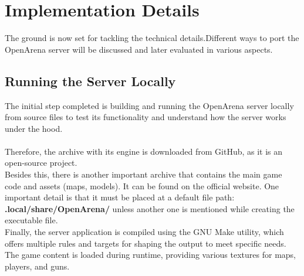 \chapter{Implementation Details}
\label{chapter:impldet}
The ground is now set for tackling the technical details.\@ Different ways to port the OpenArena server will be discussed and later evaluated in various aspects.
\section{Running the Server Locally}
The initial step completed is building and running the OpenArena server locally from source files to test its functionality and understand
how the server works under the hood. \\ \\
Therefore, the archive with its engine is downloaded from GitHub\cite{openarena-github}, as it is an open-source project. \\
Besides this, there is another important archive that contains the main game code and assets (maps, models). It can be found on the official website\cite{openarena-download}. One important
detail is that it must be placed at a default file path: \textbf{.local/share/OpenArena/} unless another one is mentioned while creating the executable file. \\
Finally, the server application is compiled using the GNU Make utility, which offers multiple rules and targets for shaping the output to meet specific needs. 
 \\
The game content is loaded during runtime, providing various textures for maps, players, and guns.
